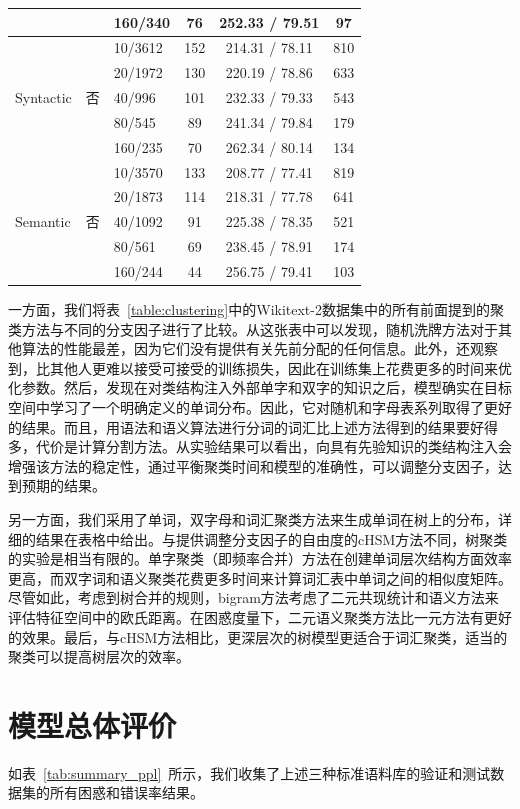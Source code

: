 \begin{table}[!t]
\begin{tabular}{lclccc}
     &&160/340&76&252.33 / 79.51&97\\
  \midrule
  \multirow{5}{*}{Syntactic}  &\multirow{5}{*}{否}&10/3612 &152&214.31 / 78.11&810\\
    &&20/1972 &130&220.19 / 78.86&633\\
    &&40/996 &101&232.33 / 79.33&543\\
    &&80/545 &89&241.34 / 79.84&179\\
    &&160/235 &70&262.34 / 80.14&134\\
  \midrule
  \multirow{5}{*}{Semantic}  &\multirow{5}{*}{否} &10/3570 &133&208.77 / 77.41&819\\
    & &20/1873 &114&218.31 / 77.78&641\\
    & &40/1092 &91&225.38 / 78.35&521\\
    & &80/561 &69&238.45 / 78.91&174\\
    & &160/244 &44&256.75 / 79.41&103\\
\bottomrule
  \end{tabular}
\end{table}

一方面，我们将表~\ref{table:clustering}中的Wikitext-2数据集中的所有前面提到的聚类方法与不同的分支因子进行了比较。从这张表中可以发现，随机洗牌方法对于其他算法的性能最差，因为它们没有提供有关先前分配的任何信息。此外，还观察到，比其他人更难以接受可接受的训练损失，因此在训练集上花费更多的时间来优化参数。然后，发现在对类结构注入外部单字和双字的知识之后，模型确实在目标空间中学习了一个明确定义的单词分布。因此，它对随机和字母表系列取得了更好的结果。而且，用语法和语义算法进行分词的词汇比上述方法得到的结果要好得多，代价是计算分割方法。从实验结果可以看出，向具有先验知识的类结构注入会增强该方法的稳定性，通过平衡聚类时间和模型的准确性，可以调整分支因子，达到预期的结果。



另一方面，我们采用了单词，双字母和词汇聚类方法来生成单词在树上的分布，详细的结果在表格中给出。与提供调整分支因子的自由度的cHSM方法不同，树聚类的实验是相当有限的。单字聚类（即频率合并）方法在创建单词层次结构方面效率更高，而双字词和语义聚类花费更多时间来计算词汇表中单词之间的相似度矩阵。尽管如此，考虑到树合并的规则，bigram方法考虑了二元共现统计和语义方法来评估特征空间中的欧氏距离。在困惑度量下，二元语义聚类方法比一元方法有更好的效果。最后，与cHSM方法相比，更深层次的树模型更适合于词汇聚类，适当的聚类可以提高树层次的效率。

\section{模型总体评价}
如表~\ref{tab:summary_ppl}~所示，我们收集了上述三种标准语料库的验证和测试数据集的所有困惑和错误率结果。

